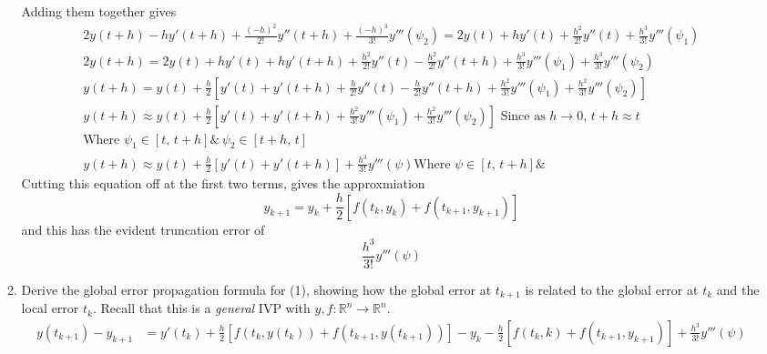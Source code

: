 \documentclass{article}
\begin{document}
\begin{enumerate}
\begin{enumerate}
               Adding them together gives 
               \begin{align*}
               2y(t + h) - hy'(t + h) 
               + \frac{(-h)^2}{2!} y''(t+h) 
               + \frac{(-h)^3}{3!}y'''(\psi_2)
               = 2y(t) + hy'(t) + \frac{h^2}{2!} y''(t) 
               + \frac{h^3}{3!}y'''(\psi_1) \\
               2y(t + h) 
               = 2y(t) + hy'(t) + hy'(t + h) + \frac{h^2}{2!} y''(t) 
               - \frac{h^2}{2!} y''(t+h) 
               + \frac{h^3}{3!}y'''(\psi_1) 
               + \frac{h^3}{3!}y'''(\psi_2) \\
               y(t + h) 
               = y(t) + \frac{h}{2}
               [y'(t) + y'(t + h) + \frac{h}{2!} y''(t) 
               - \frac{h}{2!} y''(t+h) 
               + \frac{h^2}{3!}y'''(\psi_1) 
               + \frac{h^2}{3!}y'''(\psi_2)] \\
               y(t + h) \approx y(t) + \frac{h}{2}
               [y'(t) + y'(t + h) 
               + \frac{h^2}{3!}y'''(\psi_1) 
               + \frac{h^2}{3!}y'''(\psi_2)] \text{ Since as }
               h \rightarrow 0,\, t + h \approx t\\
               \text{Where } \psi_1 \in [t,\, t+h] \& \,
               \psi_2 \in [t+h ,\, t] \\
               y(t + h) \approx y(t) + \frac{h}{2}
               [y'(t) + y'(t + h)]
               + \frac{h^3}{3!}y'''(\psi) 
               \text{Where } \psi \in [t,\, t+h] \& \,
               \end{align*}
               Cutting this equation off at the first two terms, gives
               the approxmiation
               \[ y_{k+1}
               = y_k + \frac{h}{2}
               [f(t_k, y_k) + f(t_{k+1}, y_{k+1})] \]
               and this has the evident truncation error of 
               \[\frac{h^3}{3!}y'''(\psi) \]
            \item Derive the global error propagation formula for (1),
                showing how the global error at $t_{k+1}$ is related
                to the global error at $t_k$ and the local error $t_k$.
                Recall that this is a \textit{general} IVP with $y,f:
                \mathbb{R}^n \rightarrow \mathbb{R}^n$.
                \begin{align*} y(t_{k+1}) - y_{k+1} &= 
                    y'(t_k) + \frac{h}{2}
                    [f(t_k, y(t_k)) + f(t_{k+1}, y(t_{k+1})) ]
                    - y_k - \frac{h}{2}[f(t_k, k)
                    + f(t_{k+1}, y_{k+1})] + \frac{h^3}{3!}y'''(\psi) \\

\end{align*}
\end{enumerate}
\end{enumerate}
\end{document}
